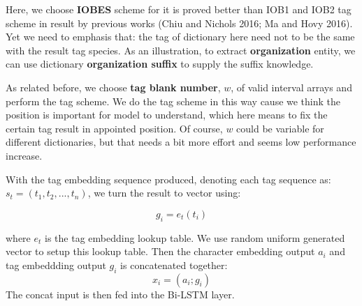 \documentclass[letterpaper]{article} %
\begin{document}
Here, we choose \textbf{IOBES} scheme for it is proved better than IOB1 and IOB2 tag scheme in result by previous works (Chiu and Nichols 2016; Ma and Hovy 2016). Yet we need to emphasis that: the tag of dictionary here need not to be the same with the result tag species. As an illustration, to extract \textbf{organization} entity, we can use dictionary \textbf{organization suffix} to supply the suffix knowledge.

As related before, we choose \textbf{tag blank number}, $w$, of valid interval arrays and perform the tag scheme. We do the tag scheme in this way cause we think the position is important for model to understand, which here means to fix the certain tag result in appointed position. Of course, $w$ could be variable for different dictionaries, but that needs a bit more effort and seems low performance increase.

With the tag embedding sequence produced, denoting each tag sequence as: $s_t = (t_1, t_2, ..., t_n)$, we turn the result to vector using: 

\begin{equation}
g_i = e_t(t_i) \label{tag_embedding}
\end{equation}

where $e_t$ is the tag embedding lookup table. We use random uniform generated vector to setup this lookup table. Then the character embedding output $a_i$ and tag embeddding output $g_i$ is concatenated together:
\begin{equation}
x_i = (a_i;g_i) \label{concat}
\end{equation}
The concat input is then fed into the Bi-LSTM layer.  

\begin{table}[t]
\caption{Statistics of Sogou MusicNER dataset.}\smallskip
\centering
{}
\label{table1}
\end{table}
\end{document}
